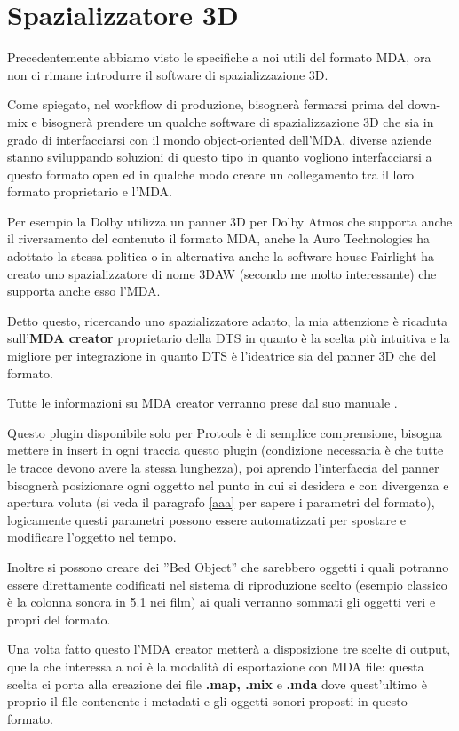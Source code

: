 \documentclass[12pt,a4paper]{report}
\begin{document}
\section{Spazializzatore 3D}

Precedentemente abbiamo visto le specifiche a noi utili del formato MDA, ora non ci rimane introdurre il software di spazializzazione 3D.

Come spiegato, nel workflow di produzione, bisognerà fermarsi prima del down-mix e bisognerà prendere un qualche software di spazializzazione 3D che sia in grado di interfacciarsi con il mondo object-oriented dell'MDA, diverse aziende stanno sviluppando soluzioni di questo tipo in quanto vogliono interfacciarsi a questo formato open ed in qualche modo creare un collegamento tra il loro formato proprietario e l'MDA.

Per esempio la Dolby utilizza un panner 3D per Dolby Atmos che supporta anche il riversamento del contenuto il formato MDA, anche la Auro Technologies ha adottato la stessa politica o in alternativa anche la software-house Fairlight ha creato uno spazializzatore di nome 3DAW (secondo me molto interessante) che supporta anche esso l'MDA.

Detto questo, ricercando uno spazializzatore adatto, la mia attenzione è ricaduta sull'\textbf{MDA creator} proprietario della DTS in quanto è la scelta più intuitiva e la migliore per integrazione in quanto DTS è l'ideatrice sia del panner 3D che del formato.

Tutte le informazioni su MDA creator verranno prese dal suo manuale \cite{creator}.

Questo plugin disponibile solo per Protools è di semplice comprensione, bisogna mettere in insert in ogni traccia questo plugin (condizione necessaria è che tutte le tracce devono avere la stessa lunghezza), poi aprendo l'interfaccia del panner bisognerà posizionare ogni oggetto nel punto in cui si desidera e con divergenza e apertura voluta (si veda il paragrafo \ref{aaa} per sapere i parametri del formato), logicamente questi parametri possono essere automatizzati per spostare e modificare l'oggetto nel tempo.

Inoltre si possono creare dei ''Bed Object'' che sarebbero oggetti i quali potranno essere direttamente codificati nel sistema di riproduzione scelto (esempio classico è la colonna sonora in 5.1 nei film) ai quali verranno sommati gli oggetti veri e propri del formato.

Una volta fatto questo l'MDA creator metterà a disposizione tre scelte di output, quella che interessa a noi è la modalità di esportazione con MDA file: questa scelta ci porta alla creazione dei file \textbf{.map, .mix} e \textbf{.mda} dove quest'ultimo è proprio il file contenente i metadati e gli oggetti sonori proposti in questo formato.
\end{document}
